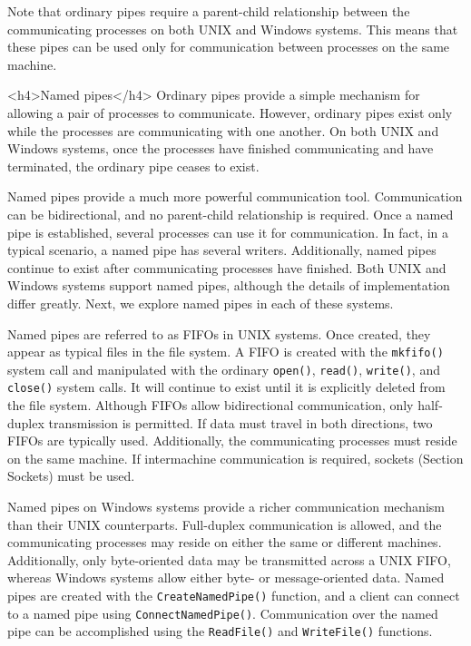 Note that ordinary pipes require a parent-child relationship between the communicating processes on both UNIX and Windows systems. This means that these pipes can be used only for communication between processes on the same machine.

<h4>Named pipes</h4>
Ordinary pipes provide a simple mechanism for allowing a pair of processes to communicate. However, ordinary pipes exist only while the processes are communicating with one another. On both UNIX and Windows systems, once the processes have finished communicating and have terminated, the ordinary pipe ceases to exist.

Named pipes provide a much more powerful communication tool. Communication can be bidirectional, and no parent-child relationship is required. Once a named pipe is established, several processes can use it for communication. In fact, in a typical scenario, a named pipe has several writers. Additionally, named pipes continue to exist after communicating processes have finished. Both UNIX and Windows systems support named pipes, although the details of implementation differ greatly. Next, we explore named pipes in each of these systems.

Named pipes are referred to as FIFOs in UNIX systems. Once created, they appear as typical files in the file system. A FIFO is created with the \texttt{mkfifo()} system call and manipulated with the ordinary \texttt{open()}, \texttt{read()}, \texttt{write()}, and \texttt{close()} system calls. It will continue to exist until it is explicitly deleted from the file system. Although FIFOs allow bidirectional communication, only half-duplex transmission is permitted. If data must travel in both directions, two FIFOs are typically used. Additionally, the communicating processes must reside on the same machine. If intermachine communication is required, sockets (Section Sockets) must be used.

Named pipes on Windows systems provide a richer communication mechanism than their UNIX counterparts. Full-duplex communication is allowed, and the communicating processes may reside on either the same or different machines. Additionally, only byte-oriented data may be transmitted across a UNIX FIFO, whereas Windows systems allow either byte- or message-oriented data. Named pipes are created with the \texttt{CreateNamedPipe()} function, and a client can connect to a named pipe using \texttt{ConnectNamedPipe()}. Communication over the named pipe can be accomplished using the \texttt{ReadFile()} and \texttt{WriteFile()} functions.

